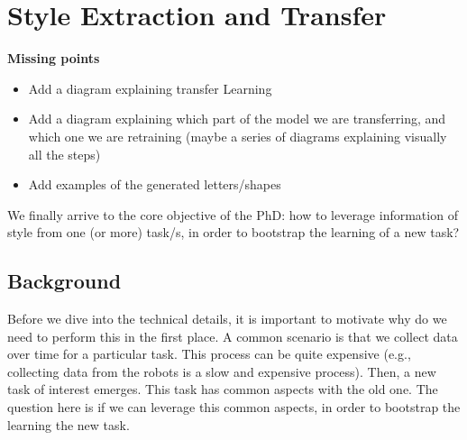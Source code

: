 \chapter{Style Extraction and Transfer} \label{ch:seat}
\minitoc%

\textbf{Missing points}
\begin{itemize}
  \item Add a diagram explaining transfer Learning
  \item Add a diagram explaining which part of the model we are transferring, and which one we are retraining (maybe a series of diagrams explaining visually all the steps)
  \item Add examples of the generated letters/shapes
\end{itemize}

\par We finally arrive to the core objective of the PhD: how to leverage information of style from one (or more) \Gls{task}/s, in order to bootstrap the learning of a new task?

\clearpage

\section{Background}

  \par Before we dive into the technical details, it is important to motivate why do we need to perform this in the first place. A common scenario is that we collect data over time for a particular task. This process can be quite expensive (e.g., collecting data from the robots is a slow and expensive process). Then, a new task of interest emerges. This task has common aspects with the old one. The question here is if we can leverage this common aspects, in order to bootstrap the learning the new task.


